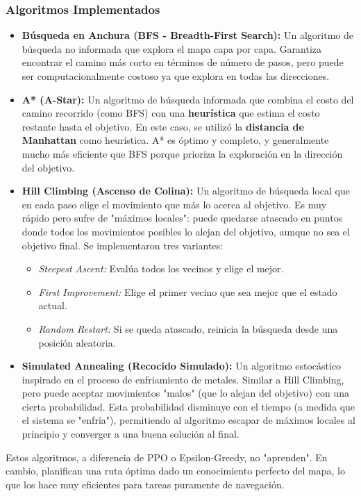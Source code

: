 \documentclass[12pt, oneside, openany]{book}
\begin{document}
\subsubsection{Algoritmos Implementados}
\begin{itemize}
    \item \textbf{Búsqueda en Anchura (BFS - Breadth-First Search):} Un algoritmo de búsqueda no informada que explora el mapa capa por capa. Garantiza encontrar el camino más corto en términos de número de pasos, pero puede ser computacionalmente costoso ya que explora en todas las direcciones.
    \item \textbf{A* (A-Star):} Un algoritmo de búsqueda informada que combina el costo del camino recorrido (como BFS) con una \textbf{heurística} que estima el costo restante hasta el objetivo. En este caso, se utilizó la \textbf{distancia de Manhattan} como heurística. A* es óptimo y completo, y generalmente mucho más eficiente que BFS porque prioriza la exploración en la dirección del objetivo.
    \item \textbf{Hill Climbing (Ascenso de Colina):} Un algoritmo de búsqueda local que en cada paso elige el movimiento que más lo acerca al objetivo. Es muy rápido pero sufre de "máximos locales": puede quedarse atascado en puntos donde todos los movimientos posibles lo alejan del objetivo, aunque no sea el objetivo final. Se implementaron tres variantes:
    \begin{itemize}
        \item \textit{Steepest Ascent:} Evalúa todos los vecinos y elige el mejor.
        \item \textit{First Improvement:} Elige el primer vecino que sea mejor que el estado actual.
        \item \textit{Random Restart:} Si se queda atascado, reinicia la búsqueda desde una posición aleatoria.
    \end{itemize}
    \item \textbf{Simulated Annealing (Recocido Simulado):} Un algoritmo estocástico inspirado en el proceso de enfriamiento de metales. Similar a Hill Climbing, pero puede aceptar movimientos "malos" (que lo alejan del objetivo) con una cierta probabilidad. Esta probabilidad disminuye con el tiempo (a medida que el sistema se "enfría"), permitiendo al algoritmo escapar de máximos locales al principio y converger a una buena solución al final.
\end{itemize}

Estos algoritmos, a diferencia de PPO o Epsilon-Greedy, no "aprenden". En cambio, planifican una ruta óptima dado un conocimiento perfecto del mapa, lo que los hace muy eficientes para tareas puramente de navegación.
\end{document}
